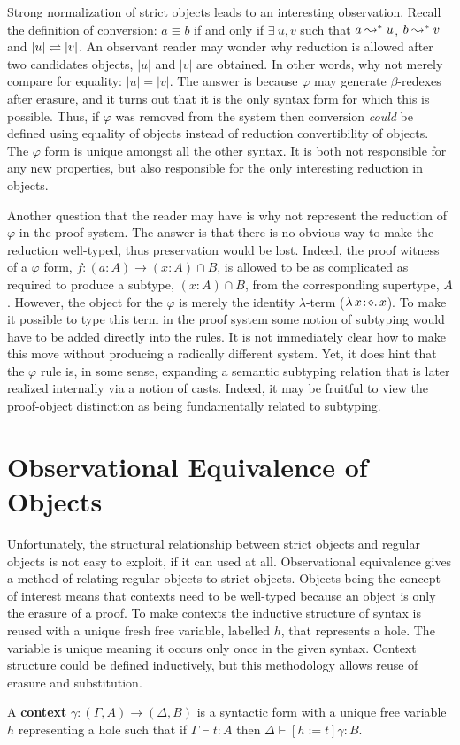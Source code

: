 Strong normalization of strict objects leads to an interesting observation.
Recall the definition of conversion: $a \equiv b$ if and only if $\exists\ u, v$ such that $a \leadsto^* u$, $b \leadsto^* v$ and $|u| \rightleftharpoons |v|$.
An observant reader may wonder why reduction is allowed after two candidates objects, $|u|$ and $|v|$ are obtained.
In other words, why not merely compare for equality: $|u| = |v|$.
The answer is because $\varphi$ may generate $\beta$-redexes after erasure, and it turns out that it is the only syntax form for which this is possible.
Thus, if $\varphi$ was removed from the system then conversion \textit{could} be defined using equality of objects instead of reduction convertibility of objects.
The $\varphi$ form is unique amongst all the other syntax.
It is both not responsible for any new properties, but also responsible for the only interesting reduction in objects.

Another question that the reader may have is why not represent the reduction of $\varphi$ in the proof system.
The answer is that there is no obvious way to make the reduction well-typed, thus preservation would be lost.
Indeed, the proof witness of a $\varphi$ form, $f : (a : A) \to (x : A) \cap B$, is allowed to be as complicated as required to produce a subtype, $(x : A) \cap B$, from the corresponding supertype, $A$.
However, the object for the $\varphi$ is merely the identity $\lambda$-term (${\lambda}\, x\! : \! \diamond.\, x$).
To make it possible to type this term in the proof system some notion of subtyping would have to be added directly into the rules.
It is not immediately clear how to make this move without producing a radically different system.
Yet, it does hint that the $\varphi$ rule is, in some sense, expanding a semantic subtyping relation that is later realized internally via a notion of casts.
Indeed, it may be fruitful to view the proof-object distinction as being fundamentally related to subtyping.

\section{Observational Equivalence of Objects}

Unfortunately, the structural relationship between strict objects and regular objects is not easy to exploit, if it can used at all.
Observational equivalence gives a method of relating regular objects to strict objects.
Objects being the concept of interest means that contexts need to be well-typed because an object is only the erasure of a proof.
To make contexts the inductive structure of syntax is reused with a unique fresh free variable, labelled $h$, that represents a hole.
The variable is unique meaning it occurs only once in the given syntax.
Context structure could be defined inductively, but this methodology allows reuse of erasure and substitution.
\begin{definition}
    A \textbf{context} $\gamma : (\Gamma, A) \to (\Delta, B)$ is a syntactic form with a unique free variable $h$ representing a hole such that if $\Gamma \vdash t : A$ then $\Delta \vdash [h := t]\gamma : B$.
\end{definition}

